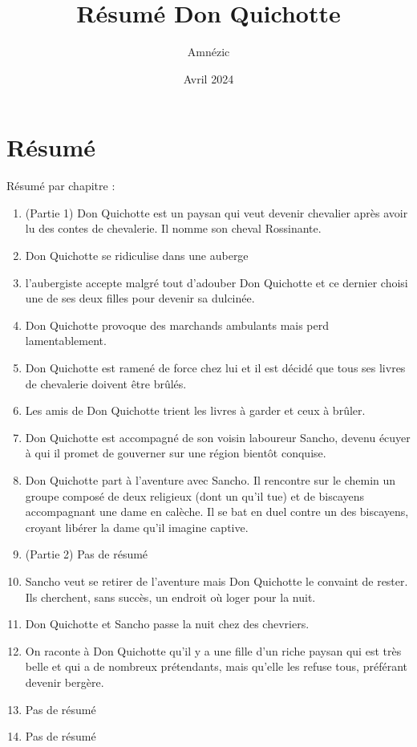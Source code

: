\documentclass{article}
\author{Amnézic}
\date{Avril 2024}
\title{Résumé Don Quichotte}
\begin{document}
\maketitle
\newpage
\section{Résumé}
Résumé par chapitre :
\begin{enumerate}
    \item (Partie 1) Don Quichotte est un paysan qui veut devenir chevalier après avoir lu des contes de chevalerie. Il nomme son cheval Rossinante.
    \item Don Quichotte se ridiculise dans une auberge
    \item l'aubergiste accepte malgré tout d'adouber Don Quichotte et ce dernier choisi une de ses deux filles pour devenir sa dulcinée.
    \item Don Quichotte provoque des marchands ambulants mais perd lamentablement.
    \item Don Quichotte est ramené de force chez lui et il est décidé que tous ses livres de chevalerie doivent être brûlés.
    \item Les amis de Don Quichotte trient les livres à garder et ceux à brûler.
    \item Don Quichotte est accompagné de son voisin laboureur Sancho, devenu écuyer à qui il promet de gouverner sur une région bientôt conquise.
    \item Don Quichotte part à l'aventure avec Sancho. Il rencontre sur le chemin un groupe composé de deux religieux (dont un qu'il tue) et de biscayens accompagnant une dame en calèche. Il se bat en duel contre un des biscayens, croyant libérer la dame qu'il imagine captive. 
    \item (Partie 2) Pas de résumé
    \item Sancho veut se retirer de l'aventure mais Don Quichotte le convaint de rester. Ils cherchent, sans succès, un endroit où loger pour la nuit.
    \item Don Quichotte et Sancho passe la nuit chez des chevriers.
    \item On raconte à Don Quichotte qu'il y a une fille d'un riche paysan qui est très belle et qui a de nombreux prétendants, mais qu'elle les refuse tous, préférant devenir bergère.
    \item Pas de résumé
    \item Pas de résumé

\end{enumerate}
\end{document}
